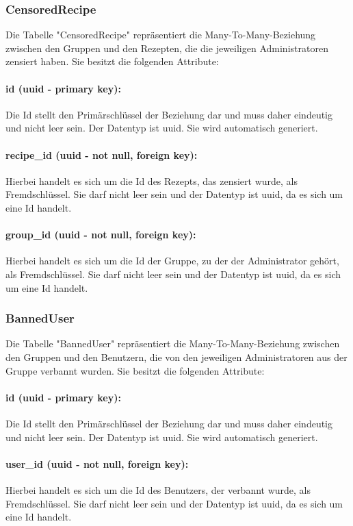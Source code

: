 \documentclass{entwurfsheft}
\begin{document}
\subsubsection{CensoredRecipe}
Die Tabelle "CensoredRecipe" repräsentiert die Many-To-Many-Beziehung zwischen den Gruppen und den Rezepten, die die jeweiligen Administratoren zensiert haben. Sie besitzt die folgenden Attribute:
\paragraph{id (uuid - primary key):} Die Id stellt den Primärschlüssel der Beziehung dar und muss daher eindeutig und nicht leer sein. Der Datentyp ist \Gls{uuid}. Sie wird automatisch generiert.
\paragraph{recipe\_id (uuid - not null, foreign key):} Hierbei handelt es sich um die Id des Rezepts, das zensiert wurde, als Fremdschlüssel. Sie darf nicht leer sein und der Datentyp ist \Gls{uuid}, da es sich um eine Id handelt.
\paragraph{group\_id (uuid - not null, foreign key):} Hierbei handelt es sich um die Id der Gruppe, zu der der Administrator gehört, als Fremdschlüssel. Sie darf nicht leer sein und der Datentyp ist \Gls{uuid}, da es sich um eine Id handelt.
\newpage

\subsubsection{BannedUser}
Die Tabelle "BannedUser" repräsentiert die Many-To-Many-Beziehung zwischen den Gruppen und den Benutzern, die von den jeweiligen Administratoren aus der Gruppe verbannt wurden. Sie besitzt die folgenden Attribute:
\paragraph{id (uuid - primary key):} Die Id stellt den Primärschlüssel der Beziehung dar und muss daher eindeutig und nicht leer sein. Der Datentyp ist \Gls{uuid}. Sie wird automatisch generiert.
\paragraph{user\_id (uuid - not null, foreign key):} Hierbei handelt es sich um die Id des Benutzers, der verbannt wurde, als Fremdschlüssel. Sie darf nicht leer sein und der Datentyp ist \Gls{uuid}, da es sich um eine Id handelt.
\end{document}
